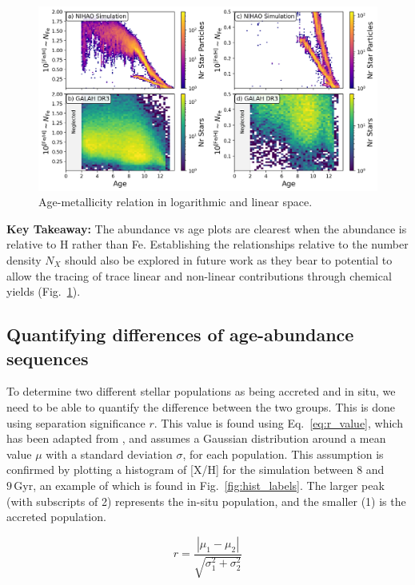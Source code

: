 \documentclass[fleqn,usenatbib]{mnras}
\begin{document}
\begin{figure}
	\includegraphics[width=\columnwidth]{figures/Fe_H_lin_time.png}
    \caption{Age-metallicity relation in logarithmic and linear space.}
    \label{fig:Fe_H_lin_time}
\end{figure}

\par\textbf{Key Takeaway:} The abundance vs age plots are clearest when the abundance is relative to H rather than Fe. Establishing the relationships relative to the number density $N_X$ should also be explored in future work as they bear to potential to allow the tracing of trace linear and non-linear contributions through chemical yields (Fig.~\ref{fig:Fe_H_lin_time}).

\subsection{Quantifying differences of age-abundance sequences} \label{sec:ageabundance}

To determine two different stellar populations as being accreted and in situ, we need to be able to quantify the difference between the two groups. This is done using separation significance $r$. This value is found using Eq.~\ref{eq:r_value}, which has been adapted from \citet{Lindegren2013}, and assumes a Gaussian distribution around a mean value $\mu$ with a standard deviation $\sigma$, for each population. This assumption is confirmed by plotting a histogram of [X/H] for the simulation between 8 and $9\,\mathrm{Gyr}$, an example of which is found in Fig.~\ref{fig:hist_labels}. The larger peak (with subscripts of 2) represents the in-situ population, and the smaller (1) is the accreted population. 

\begin{equation} \label{eq:r_value}
r = \frac{|\mu_1 - \mu_2|}{\sqrt{\sigma_1^2 + \sigma_2^2}}
\end{equation}
\end{document}

